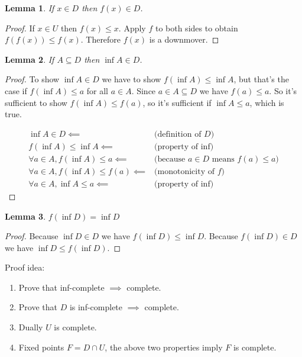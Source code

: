 \documentclass[a4paper, 11pt]{article}
\newtheorem{lemma}{Lemma}
\begin{document}
\begin{lemma}
  If $x \in D$ then $f(x) \in D$.
\end{lemma}
\begin{proof}
  If $x \in U$ then $f(x) \leq x$. Apply $f$ to both sides to obtain $f(f(x)) \leq f(x)$. Therefore $f(x)$ is a downmover.
\end{proof}

\begin{lemma}
  If $A \subseteq D$ then $\inf A \in D$.
\end{lemma}
\begin{proof}
  To show $\inf A \in D$ we have to show $f(\inf A) \leq \inf A$, but that's the case if $f(\inf A) \leq a$ for all $a \in A$. Since $a \in A \subseteq D$ we have $f(a) \leq a$. So it's sufficient to show $f(\inf A) \leq f(a)$, so it's sufficient if $\inf A \leq a$, which is true.

  \begin{align}
    \inf A \in D \impliedby & \text{(definition of $D$)} \\
    f(\inf A) \leq \inf A \impliedby & \text{(property of $\inf$)}\\
    \forall a \in A, f(\inf A) \leq a \impliedby & \text{(because $a \in D$ means $f(a) \leq a$)} \\
    \forall a \in A, f(\inf A) \leq f(a) \impliedby & \text{(monotonicity of $f$)}\\
    \forall a \in A, \inf A \leq a \impliedby & \text{(property of $\inf$)}
  \end{align}
\end{proof}

\begin{lemma}
  $f(\inf D) = \inf D$
\end{lemma}
\begin{proof}
  Because $\inf D \in D$ we have $f(\inf D) \leq \inf D$. Because $f(\inf D) \in D$ we have $\inf D \leq f(\inf D)$.
\end{proof}

Proof idea:

\begin{enumerate}
  \item Prove that inf-complete $\implies$ complete.
  \item Prove that $D$ is inf-complete $\implies$ complete.
  \item Dually $U$ is complete.
  \item Fixed points $F = D \cap U$, the above two properties imply $F$ is complete.
\end{enumerate}
\end{document}
